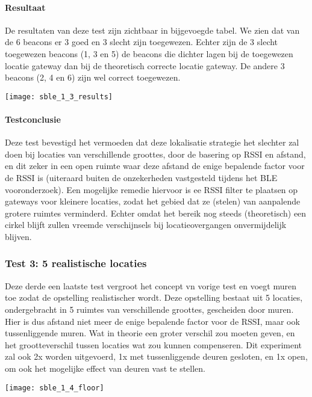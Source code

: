 \paragraph{Resultaat}
\begin{minipage}{0.55\textwidth}
De resultaten van deze test zijn zichtbaar in bijgevoegde tabel. We zien dat van de 6 beacons er 3 goed en 3 slecht zijn toegewezen. Echter zijn de 3 slecht toegewezen beacons (1, 3 en 5) de beacons die dichter lagen bij de toegewezen locatie gateway dan bij de theoretisch correcte locatie gateway. De andere 3 beacons (2, 4 en 6) zijn wel correct toegewezen. 
\end{minipage}
\hfill
\begin{minipage}{0.42\textwidth}
	\texttt{[image: sble\_1\_3\_results]}
	\label{fig:ond-ble-static-1-3-res}
\end{minipage}

\paragraph{Testconclusie}
Deze test bevestigd het vermoeden dat deze lokalisatie strategie het slechter zal doen bij locaties van verschillende groottes, door de basering op RSSI en afstand, en dit zeker in een open ruimte waar deze afstand de enige bepalende factor voor de RSSI is (uiteraard buiten de onzekerheden vastgesteld tijdens het BLE vooronderzoek). Een mogelijke remedie hiervoor is ee RSSI filter te plaatsen op gateways voor kleinere locaties, zodat het gebied dat ze (stelen) van aanpalende grotere ruimtes verminderd. Echter omdat het bereik nog steeds (theoretisch) een cirkel blijft zullen vreemde verschijnsels bij locatieovergangen onvermijdelijk blijven.

\subsubsection{Test 3: 5 realistische locaties}
\begin{minipage}{0.55\textwidth}
Deze derde een laatste test vergroot het concept vn vorige test en voegt muren toe zodat de opstelling realistischer wordt. Deze opstelling bestaat uit 5 locaties, ondergebracht in 5 ruimtes van verschillende groottes, gescheiden door muren. Hier is dus afstand niet meer de enige bepalende factor voor de RSSI, maar ook tussenliggende muren. Wat in theorie een groter verschil zou moeten geven, en het grootteverschil tussen locaties wat zou kunnen compenseren. Dit experiment zal ook 2x worden uitgevoerd, 1x met tussenliggende deuren gesloten, en 1x open, om ook het mogelijke effect van deuren vast te stellen.
\end{minipage}
\hfill
\begin{minipage}{0.42\textwidth}
	\texttt{[image: sble\_1\_4\_floor]}
	\label{fig:ond-ble-static-1-4-ops}
\end{minipage}

